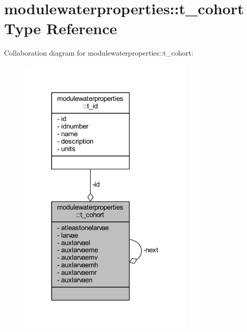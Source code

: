 \hypertarget{structmodulewaterproperties_1_1t__cohort}{}\section{modulewaterproperties\+:\+:t\+\_\+cohort Type Reference}
\label{structmodulewaterproperties_1_1t__cohort}


Collaboration diagram for modulewaterproperties\+:\+:t\+\_\+cohort\+:\nopagebreak
\begin{figure}[H]
\begin{center}
\leavevmode
\includegraphics[width=237pt]{structmodulewaterproperties_1_1t__cohort__coll__graph}
\end{center}
\end{figure}
